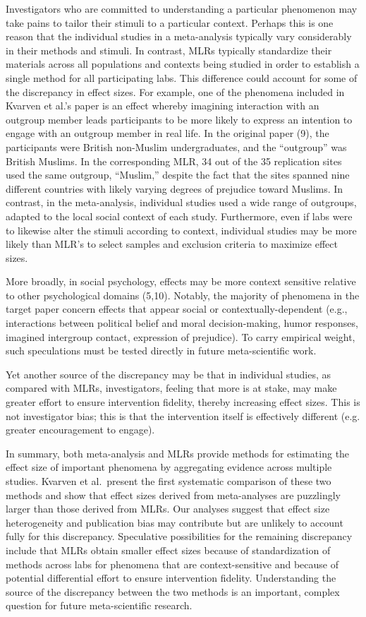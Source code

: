 \documentclass[12pt]{article}
\begin{document}
Investigators who are committed to understanding a particular phenomenon may take pains to tailor their stimuli to a particular context. Perhaps this is one reason that the individual studies in a meta-analysis typically vary considerably in their methods and stimuli. In contrast, MLRs typically standardize their materials across all populations and contexts being studied in order to establish a single method for all participating labs. This difference could account for some of the discrepancy in effect sizes. For example, one of the phenomena included in Kvarven et al.’s paper is an effect whereby imagining interaction with an outgroup member leads participants to be more likely to express an intention to engage with an outgroup member in real life. In the original paper (9), the participants were British non-Muslim undergraduates, and the “outgroup” was British Muslims. In the corresponding MLR, 34 out of the 35 replication sites used the same outgroup, “Muslim,” despite the fact that the sites spanned nine different countries with likely varying degrees of prejudice toward Muslims. In contrast, in the meta-analysis, individual studies used a wide range of outgroups, adapted to the local social context of each study. Furthermore, even if labs were to likewise alter the stimuli according to context, individual studies may be more likely than MLR's to select samples and exclusion criteria to maximize effect sizes.

More broadly, in social psychology, effects may be more context sensitive relative to other psychological domains (5,10). Notably, the majority of phenomena in the target paper concern effects that appear social or contextually-dependent (e.g., interactions between political belief and moral decision-making, humor responses, imagined intergroup contact, expression of prejudice). To carry empirical weight, such speculations must be tested directly in future meta-scientific work. 

Yet another source of the discrepancy may be that in individual studies, as compared with MLRs, investigators, feeling that more is at stake, may make greater effort to ensure intervention fidelity, thereby increasing effect sizes. This is not investigator bias; this is that the intervention itself is effectively different (e.g. greater encouragement to engage).

In summary, both meta-analysis and MLRs provide methods for estimating the effect size of important phenomena by aggregating evidence across multiple studies. Kvarven et al.\ present the first systematic comparison of these two methods and show that effect sizes derived from meta-analyses are puzzlingly larger than those derived from MLRs. Our analyses suggest that effect size heterogeneity and publication bias may contribute but are unlikely to account fully for this discrepancy. Speculative possibilities for the remaining discrepancy include that MLRs obtain smaller effect sizes because of standardization of methods across labs for phenomena that are context-sensitive and because of potential differential effort to ensure intervention fidelity. Understanding the source of the discrepancy between the two methods is an important, complex question for future meta-scientific research.
\end{document}
